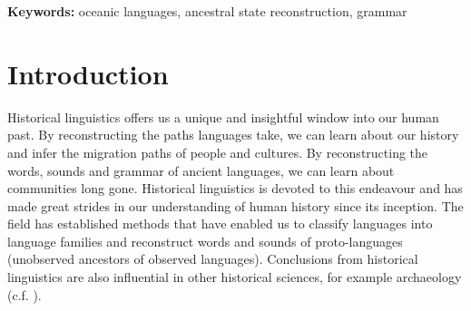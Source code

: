 \documentclass[12pt,letterpaper]{article}
\begin{document}
\begin{abstract}
\end{abstract}


\noindent\textbf{Keywords:} oceanic languages, ancestral state reconstruction, grammar





\section{Introduction}
\label{acr:intro}
Historical linguistics offers us a unique and insightful window into our human past. By reconstructing the paths languages take, we can learn about our history and infer the migration paths of people and cultures. By reconstructing the words, sounds and grammar of ancient languages, we can learn about communities long gone. Historical linguistics is devoted to this endeavour and has made great strides in our understanding of human history since its inception. The field has established methods that have enabled us to classify languages into language families and reconstruct words and sounds of proto-languages (unobserved ancestors of observed languages). Conclusions from historical linguistics are also influential in other historical sciences, for example archaeology (c.f. \citet[S364]{bellwood2011holocene}).
\end{document}

